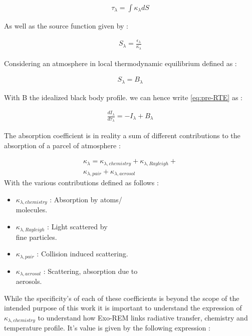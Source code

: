 \begin{align}
    \tau_{\lambda} = \int \kappa_{\lambda} dS
\end{align}

As well as the source function given by :

\begin{align}
    S_{\lambda} = \frac{\epsilon_{\lambda}}{\kappa_{\lambda}}
\end{align}

Considering an atmosphere in local thermodynamic equilibrium defined as :

\begin{align}
    S_{\lambda} = B_{\lambda}
\end{align}

With B the idealized black body profile. we can hence write \cref{eq:pre-RTE} as :\par

\begin{align}
    \frac{dI_{\lambda}}{d\tau_{\lambda}} = -I_{\lambda} + B_{\lambda}
\end{align}

The absorption coefficient is in reality a sum of different contributions to the absorption of a parcel of atmosphere :

\begin{align}
    \kappa_{\lambda} = \kappa_{\lambda, chemistry} + \kappa_{\lambda, Rayleigh} + \nonumber \\
    \kappa_{\lambda, pair} + \kappa_{\lambda, aerosol}
\end{align}
With the various contributions defined as follows :\par
\begin{itemize}
    \item {$\kappa_{\lambda, chemistry}$} : Absorption by atoms/\\molecules.
    \item {$\kappa_{\lambda, Rayleigh}$} : Light scattered by \\fine particles.
    \item {$\kappa_{\lambda, pair}$} : Collision induced scattering.
    \item {$\kappa_{\lambda, aerosol}$ : Scattering, absorption due to\\ aerosols.}
\end{itemize}

While the specificity's of each of these coefficients is beyond the scope of the intended purpose of this work it is important to understand the expression of $\kappa_{\lambda, chemistry}$ to understand how Exo-REM links radiative transfer, chemistry and temperature profile. It's value is given by the following expression :


